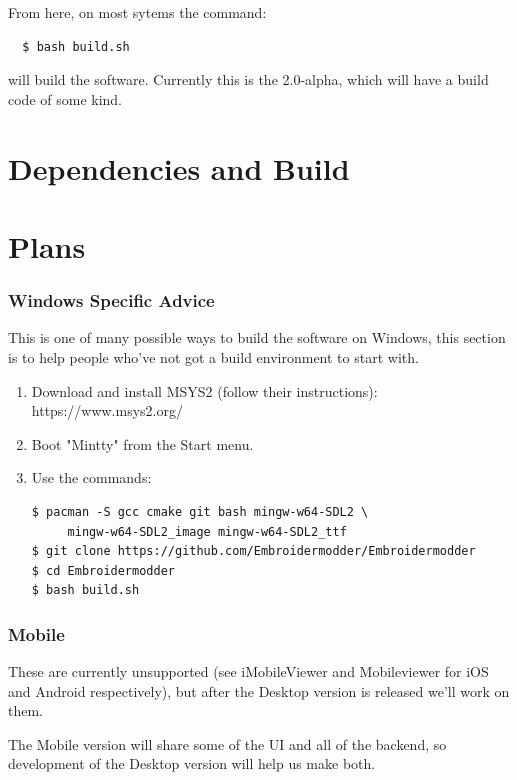 \documentclass[a4paper, 11pt]{report}
\begin{document}
From here, on most sytems the command:

\begin{verbatim}
  $ bash build.sh
\end{verbatim}

will build the software. Currently this is the 2.0-alpha, which will have a build code of
some kind.

\section{Dependencies and Build}

\section{Plans}

\subsubsection{Windows Specific Advice}

This is one of many possible ways to build the software on Windows,
this section is to help people who've not got a build environment to start with.

\begin{enumerate}
\item Download and install MSYS2 (follow their instructions): https://www.msys2.org/
\item Boot "Mintty" from the Start menu.
\item Use the commands:

\begin{lstlisting}
$ pacman -S gcc cmake git bash mingw-w64-SDL2 \
     mingw-w64-SDL2_image mingw-w64-SDL2_ttf
$ git clone https://github.com/Embroidermodder/Embroidermodder
$ cd Embroidermodder
$ bash build.sh
\end{lstlisting}
\end{enumerate}

\subsubsection{Mobile}

These are currently unsupported (see iMobileViewer and Mobileviewer for
iOS and Android respectively), but after the Desktop version is
released we'll work on them.

The Mobile version will share some of the UI and all of the backend,
so development of the Desktop version will help us make both.
\end{document}
